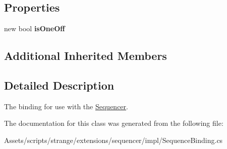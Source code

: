 \subsection*{Properties}
\begin{DoxyCompactItemize}
\item 
\hypertarget{classstrange_1_1extensions_1_1sequencer_1_1impl_1_1_sequence_binding_a93d2933bd23236e8d0dafbea9f646a96}{new bool {\bfseries is\-One\-Off}}\label{classstrange_1_1extensions_1_1sequencer_1_1impl_1_1_sequence_binding_a93d2933bd23236e8d0dafbea9f646a96}

\end{DoxyCompactItemize}
\subsection*{Additional Inherited Members}


\subsection{Detailed Description}
The binding for use with the \hyperlink{classstrange_1_1extensions_1_1sequencer_1_1impl_1_1_sequencer}{Sequencer}. 

The documentation for this class was generated from the following file\-:\begin{DoxyCompactItemize}
\item 
Assets/scripts/strange/extensions/sequencer/impl/Sequence\-Binding.\-cs\end{DoxyCompactItemize}
